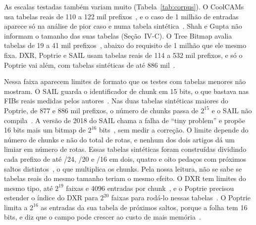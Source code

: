 \documentclass[conference,a4paper]{IEEEtran}
\begin{document}
As escalas testadas também variam muito (Tabela~\ref{tab:corpus}). O CoolCAMs usa tabelas reais de 110 a 122 mil
prefixos~\cite[Tab.~II]{zane03}, e o caso de 1 milhão de entradas aparece só na análise de pior caso e numa tabela
sintética~\cite[\S III-D, \S IV-D]{zane03}. Shah e Gupta não informam o tamanho das suas tabelas (Seção~IV-C). O Tree Bitmap avalia tabelas de 19 a 41 mil prefixos~\cite[Tab.~6]{eath04},
abaixo do requisito de 1 milhão que ele mesmo fixa. DXR, Poptrie e SAIL usam tabelas reais de 114 a 532 mil prefixos, e só
o Poptrie vai além, com tabelas sintéticas de até 886 mil~\cite[Tab.~1]{asai15}.

Nessa faixa aparecem limites de formato que os testes com tabelas menores não mostram. O SAIL guarda o identificador de
chunk em 15 bits, o que bastava nas FIBs reais medidas pelos autores~\cite[\S IV-B]{yang18}. Nas duas tabelas sintéticas
maiores do Poptrie, de 877 e 886 mil prefixos, o número de chunks passa de $2^{15}$ e o SAIL não
compila~\cite[\S4.8, Tab.~5]{asai15}. A versão de 2018 do SAIL chama a falha de ``tiny problem'' e propõe 16 bits mais um
bitmap de $2^{16}$ bits~\cite[\S VI-C]{yang18}, sem medir a correção. O limite depende do número de chunks e não do total
de rotas, e nenhum dos dois artigos dá um limiar em número de rotas. Essas tabelas sintéticas foram construídas dividindo
cada prefixo de até /24, /20 e /16 em dois, quatro e oito pedaços com próximos saltos distintos~\cite[\S4.1]{asai15}, o
que multiplica os chunks. Pela nossa leitura, não se sabe se tabelas reais do mesmo tamanho teriam o mesmo efeito. O DXR
tem limites do mesmo tipo, até $2^{19}$ faixas e 4096 entradas por chunk~\cite[\S3.2]{zec12}, e o Poptrie precisou
estender o índice do DXR para $2^{20}$ faixas para rodá-lo nessas tabelas~\cite[\S4.8]{asai15}. O Poptrie limita a $2^{16}$
as entradas da sua tabela de próximos saltos, porque a folha tem 16 bits, e diz que o campo pode crescer ao custo de mais
memória~\cite[\S5]{asai15}.
\end{document}
